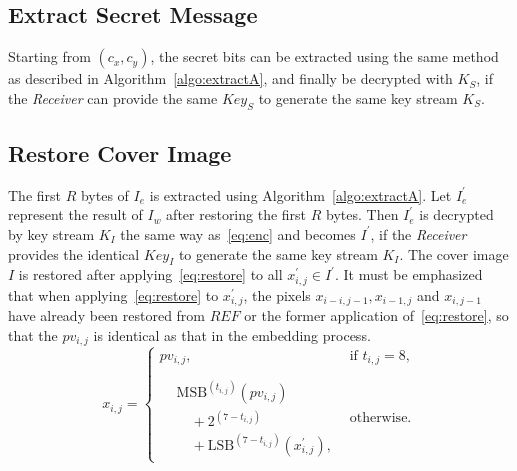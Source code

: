 \documentclass[journal]{IEEEtran}
\begin{document}
	
	
	
	
	
	\subsection{Extract Secret Message}
	
	Starting from \((c_x, c_y)\), the secret bits can be extracted using the same method as described in Algorithm~\ref{algo:extractA}, and finally be decrypted with \(K_S\), if the \emph{Receiver} can provide the same \(Key_S\) to generate the same key stream \(K_S\).
	
	
	
	
	
	\subsection{Restore Cover Image}
	
	The first \(R\) bytes of \(I_e\) is extracted using Algorithm~\ref{algo:extractA}.
	Let \(I_e^\prime\) represent the result of \(I_w\) after restoring the first \(R\) bytes.
	Then \(I_e^\prime\) is decrypted by key stream \(K_I\) the same way as~\eqref{eq:enc} and becomes \(I^\prime\), if the \emph{Receiver} provides the identical \(Key_I\) to generate the same key stream \(K_I\).
	The cover image \(I\) is restored after applying~\eqref{eq:restore} to all \(x^\prime_{i, j} \in I^\prime\).
%	
	It must be emphasized that when applying~\eqref{eq:restore} to \(x^\prime_{i, j}\), the pixels \(x_{i - i, j - 1}, x_{i - 1, j}\) and \(x_{i, j -1}\) have already been restored from \(REF\) or the former application of~\eqref{eq:restore}, so that the \(pv_{i, j}\) is identical as that in the embedding process.
%	
	\begin{equation}
		\label{eq:restore}
		x_{i, j} =
		\begin{cases}
			pv_{i, j}                          ,& \text{if } t_{i, j} = 8, \\
			\\
			\begin{aligned}
				&\mathrm{MSB}^{(t_{i, j})}(pv_{i, j})  \\
				&\quad {+} 2^{(7 - t_{i, j})} \\
				&\quad {+} \mathrm{LSB}^{(7 - t_{i, j})}(x^\prime_{i, j}),
			\end{aligned} & \text{otherwise}.
		\end{cases}
	\end{equation}
	
\end{document}
